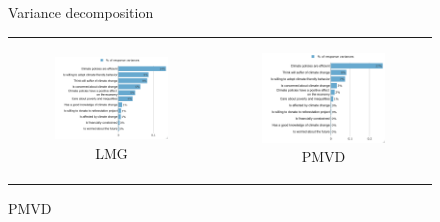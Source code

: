 \documentclass{article}
\begin{document}
\begin{figure}[h!]
\begin{center}
	\caption{Variance decomposition}
	\caption*{Index 3 Main Policies}
	\setlength\extrarowheight{-1pt}
	\begin{tabular}{cc}
		\begin{subfigure}{0.5\textwidth}
		\caption{LMG}
			\includegraphics[width=\textwidth]{lmg_main_policies_non_standardized}
		\end{subfigure}&
		\begin{subfigure}{0.5\textwidth}
		\caption{PMVD}
			\includegraphics[width=\textwidth]{pmvd_main_policies_non_standardized}
		\end{subfigure}\\
	\end{tabular}


\end{center}
\end{figure}
\end{document}
